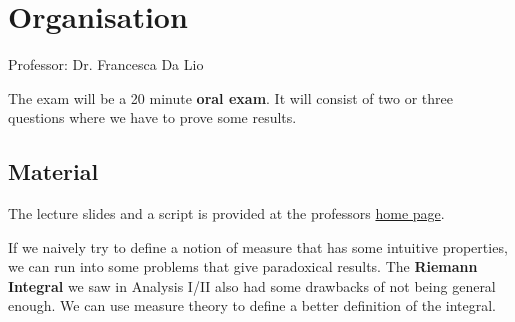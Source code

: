 \setcounter{section}{-1}
\section{Organisation}

Professor: Dr. Francesca Da Lio

The exam will be a 20 minute \textbf{oral exam}. It will consist of two or three questions where we have to prove some results.


\subsection*{Material}
The lecture slides and a script is provided at the professors \href{https://people.math.ethz.ch/~fdalio/MASSundINTEGRALFS21}{home page}.


If we naively try to define a notion of measure that has some intuitive properties, we can run into some problems that give paradoxical results.
The \textbf{Riemann Integral} we saw in Analysis I/II also had some drawbacks of not being general enough. 
We can use measure theory to define a better definition of the integral.
